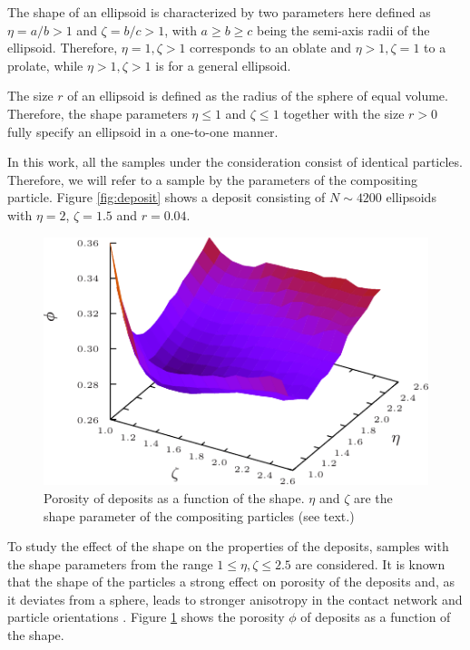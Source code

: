 \documentclass[aps,twocolumn,superscriptaddress,showpacs,showkeys]{revtex4-1}
\begin{document}
The shape of an ellipsoid is characterized by two parameters here defined as
$\eta=a/b>1$ and $\zeta=b/c>1$, with $a \ge b \ge c$ being the semi-axis radii
of the ellipsoid.  Therefore, $\eta=1,\zeta>1$ corresponds to an oblate and
$\eta>1,\zeta=1$ to a prolate, while $\eta>1,\zeta>1$ is for a general
ellipsoid.

The size $r$ of an ellipsoid is defined as the radius of the sphere of equal
volume. Therefore, the shape parameters $\eta \le 1$ and $\zeta \le 1$
together with the size $r>0$ fully specify an ellipsoid in a one-to-one
manner.
 
In this work, all the samples under the consideration consist of identical
particles.  Therefore, we will refer to a sample by the parameters of the
compositing particle.  Figure \ref{fig:deposit} shows a deposit consisting of
$N\sim 4200$ ellipsoids with $\eta=2$, $\zeta=1.5$ and $r=0.04$.


\begin{figure}
\begin{center}
\includegraphics*[width=1.0\columnwidth]{data-figs/porosity}
\caption{\protect
	Porosity of deposits as a function of the shape. $\eta$ and $\zeta$ 
	are the shape parameter of the compositing particles (see text.)
	}
\label{fig:porosity}
\end{center}
\end{figure}

To study the effect of the shape on the properties of the deposits, samples
with the shape parameters from the range $1 \le \eta, \zeta \le 2.5$ are
considered. It is known that the shape of the particles a strong effect on
porosity of the deposits and, as it deviates from a sphere, leads to stronger
anisotropy in the contact network and particle orientations
\cite{ref:reza-pedro2011}.  Figure \ref{fig:porosity} shows the porosity
$\phi$ of deposits as a function of the shape.
\end{document}
